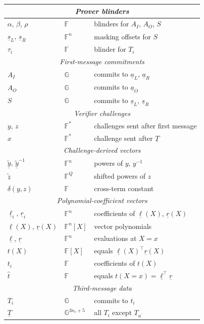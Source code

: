 \documentclass{article}
\theoremstyle{definition}
\newcommand{\GG}{\mathbb{G}}
\newcommand{\FF}{\mathbb{F}}
\newcommand{\zq}{\widetilde{\underline{z}}}
\newcommand{\yq}{\widetilde{\underline{y}}}
\begin{document}
\begin{longtable}{|p{}|p{}|p{}|}
\hline
\multicolumn{3}{|c|}{\textit{Prover blinders}} \\
\hline
$\alpha$, $\beta$, $\rho$ & $\FF$ & blinders for $A_I$, $A_O$, $S$ \\
$\underline{s}_L$, $\underline{s}_R$ & $\FF^n$ & masking offsets for $S$ \\
$\tau_i$ & $\FF$ & blinder for $T_i$ \\
\hline
\multicolumn{3}{|c|}{\textit{First-message commitments}} \\
\hline
$A_I$ & $\GG$ & commits to $\underline{a}_L$, $\underline{a}_R$ \\
$A_O$ & $\GG$ & commits to $\underline{a}_O$ \\
$S$ & $\GG$ & commits to $\underline{s}_L$, $\underline{s}_R$ \\
\hline
\multicolumn{3}{|c|}{\textit{Verifier challenges}} \\
\hline
$y$, $z$ & $\FF^*$ & challenges sent after first message \\
$x$ & $\FF^*$ & challenge sent after $\underline{T}$ \\
\hline
\multicolumn{3}{|c|}{\textit{Challenge-derived vectors}} \\
\hline
$\yq$, $\yq^{-1}$ & $\FF^n$ & powers of $y$, $y^{-1}$ \\
$\zq$ & $\FF^Q$ & shifted powers of $z$ \\
$\delta(y,z)$ & $\FF$ & cross-term constant \\
\hline
\multicolumn{3}{|c|}{\textit{Polynomial-coefficient vectors}} \\
\hline
$\underline{\ell}_i$, $\underline{r}_i$ & $\FF^n$ & coefficients of $\underline{\ell}(X)$, $\underline{r}(X)$ \\
$\underline{\ell}(X)$, $\underline{r}(X)$ & $\FF^n[X]$ & vector polynomials \\
$\underline{\ell}$, $\underline{r}$ & $\FF^n$ & evaluations at $X = x$ \\
$t(X)$ & $\FF[X]$ & equals $\underline{\ell}(X)^\top \underline{r}(X)$ \\
$t_i$ & $\FF$ & coefficients of $t(X)$ \\
$\widehat{t}$ & $\FF$ & equals $t(X = x) = \underline{\ell}^\top \underline{r}$ \\
\hline
\multicolumn{3}{|c|}{\textit{Third-message data}} \\
\hline
$T_i$ & $\GG$ & commits to $t_i$ \\
$\underline{T}$ & $\GG^{3n_c+5}$ & all $T_i$ except $T_{n^\prime}$ \\

\end{longtable}
\end{document}

